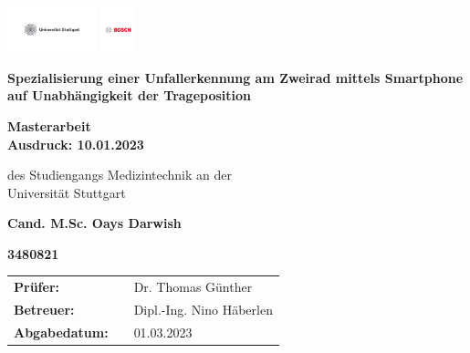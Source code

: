 \relax
\begin{center}
	\begin{center}
			\includegraphics[height=1.3cm]{Bilder/Logos/unistuttgart_logo_deutsch2.pdf} \hfill \includegraphics[height=1.3cm]{Bilder/Logos/BoschLogotype2.pdf}
	\end{center}
	\vspace*{2.5cm} 
	\begin{center}
		\LARGE\textbf{Spezialisierung einer Unfallerkennung am Zweirad mittels Smartphone auf Unabhängigkeit der Trageposition}
	\end{center}
	\vspace{2.5cm}
	
	\begin{center}
		\textbf{Masterarbeit\\Ausdruck: 10.01.2023}
	\end{center}
	\vspace{1cm}
	
	\begin{center}
		des Studiengangs Medizintechnik an der\\
		Universität Stuttgart
	\end{center}
	\vspace{1.8cm}
	\begin{center}
		\textbf{Cand. M.Sc. Oays Darwish} 
	\end{center}	
	
	\begin{center}
		\textbf{3480821}
	\end{center}
	\vspace{2.5cm}
	\begin{center}
		\begin{tabular}{lll}
			\textbf{Prüfer: }&& Dr. Thomas Günther\\
			\textbf{Betreuer:}&& Dipl.-Ing. Nino Häberlen \\
			\textbf{Abgabedatum: }&& 01.03.2023\\
		\end{tabular}
	\end{center}	
	
\end{center}